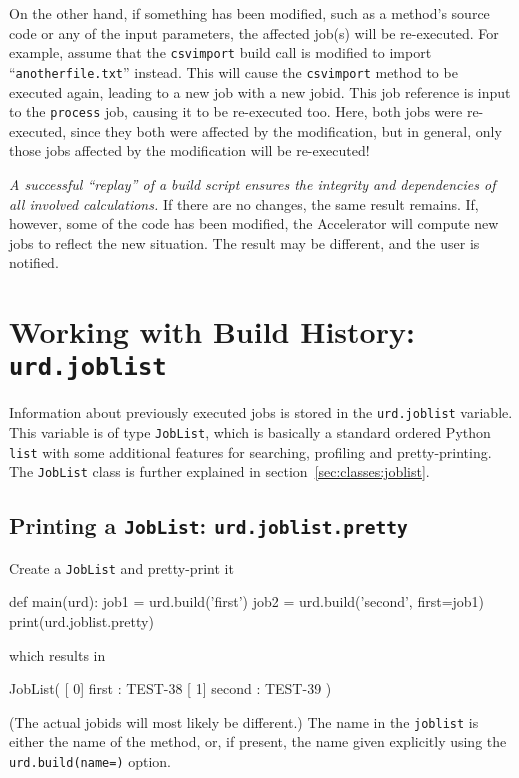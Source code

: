 On the other hand, if something has been modified, such as a method's
source code or any of the input parameters, the affected job(s) will
be re-executed.  For example, assume that the \texttt{csvimport} build
call is modified to import ``\texttt{anotherfile.txt}'' instead.  This
will cause the \texttt{csvimport} method to be executed again, leading
to a new job with a new jobid.  This job reference is input to
the \texttt{process} job, causing it to be re-executed too.  Here,
both jobs were re-executed, since they both were affected by the
modification, but in general, only those jobs affected by the
modification will be re-executed!

\textsl{A successful ``replay'' of a build script ensures the integrity and
dependencies of all involved calculations.}  If there are no changes,
the same result remains.  If, however, some of the code has been
modified, the Accelerator will compute new jobs to reflect the new
situation.  The result may be different, and the user is notified.


\section{Working with Build History:  \texttt{urd.joblist}}
\label{sec:joblist}

Information about previously executed jobs is stored in
the \texttt{urd.joblist} variable.  This variable is of
type \texttt{JobList}, which is basically a standard ordered
Python \texttt{list} with some additional features for searching,
profiling and pretty-printing.  The \texttt{JobList} class is further
explained in section~\ref{sec:classes:joblist}.



\subsection{Printing a \texttt{JobList}:  \texttt{urd.joblist.pretty}}
Create a \texttt{JobList} and pretty-print it
\begin{python}
def main(urd):
    job1 = urd.build('first')
    job2 = urd.build('second', first=job1)
    print(urd.joblist.pretty)
\end{python}
which results in
\begin{shell}
JobList(
   [  0]  first : TEST-38
   [  1] second : TEST-39
)
\end{shell}
(The actual jobids will most likely be different.)  The name in
the \texttt{joblist} is either the name of the method, or, if present,
the name given explicitly using the \texttt{urd.build(name=)} option.



